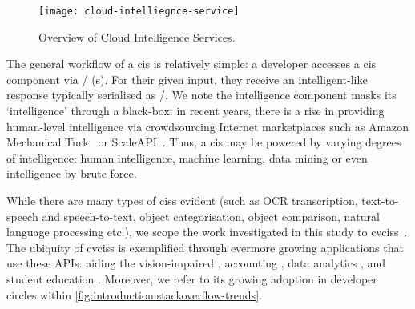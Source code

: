 \begin{figure}[h!]
\centering
\caption[Overview of cloud intelligence services]{Overview of Cloud Intelligence Services.}
\label{fig:introduction:cloud-intelliegnce-service}
\texttt{[image: cloud-intelliegnce-service]}
\end{figure}

 
The general workflow of a \gls{cis} is relatively simple: a developer accesses a \gls{cis} component via / (s). For their given input, they receive an intelligent-like response typically serialised as /. We note the intelligence component masks its `intelligence' through a black-box: in recent years, there is a rise in providing human-level intelligence via crowdsourcing Internet marketplaces such as Amazon Mechanical Turk~\citep{MTurk:Home} or ScaleAPI~\citep{ScaleAPI:Home}. Thus, a \gls{cis} may be powered by varying degrees of intelligence: human intelligence, machine learning, data mining or even intelligence by brute-force.

While there are many types of \glspl{cis} evident (such as OCR transcription, text-to-speech and speech-to-text, object categorisation, object comparison, natural language processing etc.), we scope the work investigated in this study to \glspl{cvcis}~\citep{GoogleCloud:Home,Azure:Home,AWS:Home,Pixlab:Home,IBM:Home,Cloudsight:Home,Clarifai:Home,DeepAI:Home,Imagaa:Home,Talkwaler:Home,Kairos:Home,Cognitec:Home,Affectiva:Home}. The ubiquity of \glspl{cvcis} is exemplified through evermore growing applications that use these APIs: aiding the vision-impaired \citep{Reis:2018cp,daMotaSilveira:2017vp}, accounting  \citep{Marshall:2018uj}, data analytics \citep{Iyengar:2017fb}, and student education \citep{Dibia:2017iy}. Moreover, we refer to its growing adoption in developer circles within \cref{fig:introduction:stackoverflow-trends}.